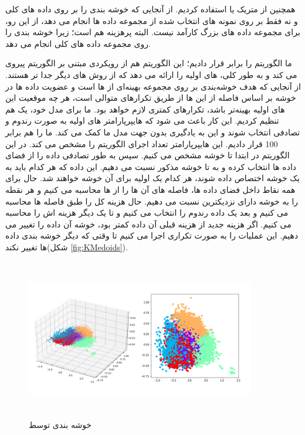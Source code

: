 \documentclass[12pt,onecolumn,a4paper]{article}
\begin{document}
همچنین از متریک  یا  استفاده کردیم. از آنجایی که خوشه بندی را بر روی داده های کلی و نه فقط بر روی نمونه های انتخاب شده از مجموعه داده ها انجام می دهد، از این رو، برای مجموعه داده های بزرگ کارآمد نیست. البته  پرهزینه هم است؛ زیرا خوشه بندی را روی مجموعه داده های کلی انجام می دهد.

ما الگوریتم  را برابر  قرار دادیم؛ این الگوریتم هم از رویکردی مبتنی بر الگوریتم  پیروی می کند و به طور کلی،  های اولیه را ارائه می دهد که از روش های دیگر جدا تر هستند. از آنجایی که هدف خوشه‌بندی  بر روی مجموعه بهینه‌ای از  ها است و عضویت داده ها در خوشه بر اساس فاصله از این  ها از طریق تکرارهای متوالی است، هر چه موقعیت‌ این  های اولیه بهینه‌تر باشد، تکرارهای کمتری لازم خواهد بود. 
ما برای مدل خود، یک  هم تنظیم کردیم. این کار باعث می شود که هایپرپارامتر های اولیه به صورت رندوم و تصادفی انتخاب شوند و این به یادگیری بدون جهت مدل ما کمک می کند.
ما  را هم برابر 100 قرار دادیم. این هایپرپارامتر تعداد اجرای الگوریتم را مشخص می کند.
در این الگوریتم در ابتدا  تا خوشه مشخص می کنیم. سپس به طور تصادفی  داده را از فضای داده ها انتخاب کرده و به  تا خوشه مذکور نسبت می دهیم. این  داده که هر کدام باید به یک خوشه اختصاص داده شوند، هر کدام یک  اولیه برای آن خوشه خواهند شد. حال برای همه نقاط داخل فضای داده ها، فاصله های آن ها را از  ها محاسبه می کنیم و هر نقطه را به خوشه دارای نزدیکترین  نسبت می دهیم. حال هزینه کل را طبق فاصله ها محاسبه می کنیم و بعد یک داده رندوم را انتخاب می کنیم و تا یک  دیگر هزینه اش را محاسبه می کنیم. اگر هزینه جدید از هزینه قبلی آن داده کمتر بود، خوشه آن داده را تغییر می دهیم. این عملیات را به صورت تکراری اجرا می کنیم تا وقتی که دیگر خوشه بندی داده ها تغییر نکند(شکل \ref{fig:KMedoids}).

\begin{figure}
  \centering
  \includegraphics[width=10cm,height=7cm,keepaspectratio]{19.png}
  \caption{خوشه بندی توسط }
  \label{fig:KMeans}
\end{figure}
\end{document}
